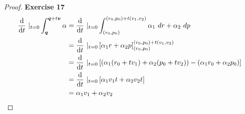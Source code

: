 \documentclass[11pt]{article}
\theoremstyle{definition}
\begin{document}
\begin{proof}{\textbf{Exercise 17}}
\begin{align*}
    \dv{t}~|_{t = 0} \int_{\bm{q}}^{\bm{q} + t\bm{v}} \alpha
    &= \dv{t}~|_{t = 0} \int_{(r_0, p_0)}^{(r_0, p_0) + t(v_1,v_2)} \alpha_1~dr + \alpha_2~dp\\
    &= \dv{t}~|_{t = 0} \left[\alpha_1 r+ \alpha_2 p
    \right]_{(r_0, p_0)}^{(r_0, p_0) + t(v_1,v_2)}\\
    &= \dv{t}~|_{t = 0} \left[(\alpha_1 (r_0 + tv_1)+ \alpha_2 (p_0 + tv_2))
    - (\alpha_1r_0 + \alpha_2 p_0)\right]\\
    &= \dv{t}~|_{t = 0} \left[\alpha_1 v_1 t + \alpha_2v_2 t\right]\\
    &= \alpha_1 v_1 + \alpha_2v_2
\end{align*}
\end{proof}
\cleardoublepage
\end{document}
